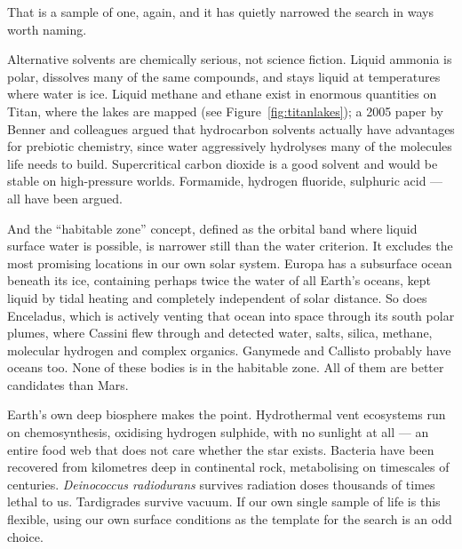  That is a sample of one, again, and it has quietly narrowed the search in
ways worth naming.

Alternative solvents are chemically serious, not science fiction. Liquid ammonia is polar,
dissolves many of the same compounds, and stays liquid at temperatures where water is ice.
Liquid methane and ethane exist in enormous quantities on Titan, where the lakes are mapped (see Figure~\ref{fig:titanlakes});
a 2005 paper by Benner and colleagues argued that hydrocarbon solvents actually have
advantages for prebiotic chemistry, since water aggressively hydrolyses many of the molecules
life needs to build. Supercritical carbon dioxide is a good solvent and would be stable on
high-pressure worlds. Formamide, hydrogen fluoride, sulphuric acid --- all have been argued.

And the ``habitable zone'' concept, defined as the orbital band where liquid surface water is
possible, is narrower still than the water criterion. It excludes the most promising
locations in our own solar system. Europa has a subsurface ocean beneath its ice, containing
perhaps twice the water of all Earth's oceans, kept liquid by tidal heating and completely
independent of solar distance. So does Enceladus, which is actively venting that ocean into
space through its south polar plumes, where Cassini flew through and detected water, salts,
silica, methane, molecular hydrogen and complex organics. Ganymede and Callisto probably
have oceans too. None of these bodies is in the habitable zone. All of them are better
candidates than Mars.

\begin{funfact}
Earth's own deep biosphere makes the point. Hydrothermal vent ecosystems run on
chemosynthesis, oxidising hydrogen sulphide, with no sunlight at all --- an entire food web
that does not care whether the star exists. Bacteria have been recovered from kilometres deep
in continental rock, metabolising on timescales of centuries. \emph{Deinococcus radiodurans}
survives radiation doses thousands of times lethal to us. Tardigrades survive vacuum. If our
own single sample of life is this flexible, using our own surface conditions as the template
for the search is an odd choice.
\end{funfact}

